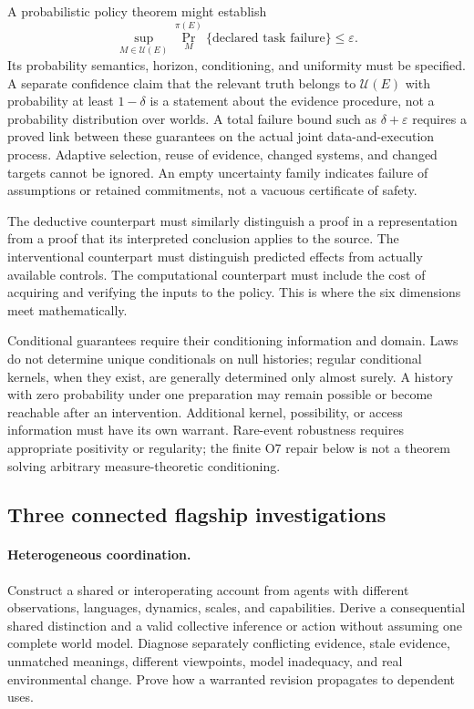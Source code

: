\documentclass[11pt]{article}
\theoremstyle{definition}
\begin{document}
A probabilistic policy theorem might establish
\[
 \sup_{M\in\mathcal U(E)}
 \Pr^{\pi(E)}_M\{\text{declared task failure}\}\leq\varepsilon.
\]
Its probability semantics, horizon, conditioning, and uniformity must be specified. A separate confidence claim that the relevant truth belongs to $\mathcal U(E)$ with probability at least $1-\delta$ is a statement about the evidence procedure, not a probability distribution over worlds. A total failure bound such as $\delta+\varepsilon$ requires a proved link between these guarantees on the actual joint data-and-execution process. Adaptive selection, reuse of evidence, changed systems, and changed targets cannot be ignored. An empty uncertainty family indicates failure of assumptions or retained commitments, not a vacuous certificate of safety.

The deductive counterpart must similarly distinguish a proof in a representation from a proof that its interpreted conclusion applies to the source. The interventional counterpart must distinguish predicted effects from actually available controls. The computational counterpart must include the cost of acquiring and verifying the inputs to the policy. This is where the six dimensions meet mathematically.

Conditional guarantees require their conditioning information and domain. Laws do not determine unique conditionals on null histories; regular conditional kernels, when they exist, are generally determined only almost surely. A history with zero probability under one preparation may remain possible or become reachable after an intervention. Additional kernel, possibility, or access information must have its own warrant. Rare-event robustness requires appropriate positivity or regularity; the finite O7 repair below is not a theorem solving arbitrary measure-theoretic conditioning.

\subsection{Three connected flagship investigations}

\paragraph{Heterogeneous coordination.}
Construct a shared or interoperating account from agents with different observations, languages, dynamics, scales, and capabilities. Derive a consequential shared distinction and a valid collective inference or action without assuming one complete world model. Diagnose separately conflicting evidence, stale evidence, unmatched meanings, different viewpoints, model inadequacy, and real environmental change. Prove how a warranted revision propagates to dependent uses.
\end{document}
